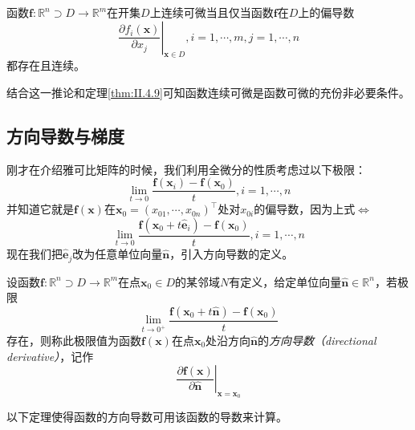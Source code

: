 \documentclass[main.tex]{subfiles}
\begin{document}
\begin{corollary}
    函数$\mathbf{f}:\mathbb{R}^n\supset D\rightarrow\mathbb{R}^m$在开集$D$上连续可微当且仅当函数$\mathbf{f}$在$D$上的偏导数
    \[
        \left.\frac{\partial f_i\left(\mathbf{x}\right)}{\partial x_j}\right|_{\mathbf{x}\in D},i=1,\cdots,m,j=1,\cdots,n
    \]
    都存在且连续。
\end{corollary}

结合这一推论和定理\ref{thm:II.4.9}可知函数连续可微是函数可微的充份非必要条件。

\subsection{方向导数与梯度}
刚才在介绍雅可比矩阵的时候，我们利用全微分的性质考虑过以下极限：
\[
    \lim_{t\to 0}\frac{\mathbf{f}\left(\mathbf{x}_i\right)-\mathbf{f}\left(\mathbf{x}_0\right)}{t},i=1,\cdots,n\]
并知道它就是$\mathbf{f}\left(\mathbf{x}\right)$在$\mathbf{x}_0=\left(x_{01},\cdots,x_{0n}\right)^\intercal$处对$x_{0i}$的偏导数，因为上式$\Leftrightarrow$
\[
    \lim_{t\rightarrow 0}\frac{\mathbf{f}\left(\mathbf{x}_0+t\mathbf{\hat{e}}_i\right)-\mathbf{f}\left(\mathbf{x}_0\right)}{t},i=1,\cdots,n
\]
现在我们把$\mathbf{\hat{e}}_j$改为任意单位向量$\mathbf{\hat{n}}$，引入方向导数的定义。

\begin{definition}[方向导数]\label{def:II.4.18}
    设函数$\mathbf{f}:\mathbb{R}^n\supset D\rightarrow\mathbb{R}^m$在点$\mathbf{x}_0\in D$的某邻域$N$有定义，给定单位向量$\mathbf{\hat{n}}\in\mathbb{R}^n$，若极限
    \[\lim_{t\to 0^+}\frac{\mathbf{f}\left(\mathbf{x}_0+t\mathbf{\hat{n}}\right)-\mathbf{f}\left(\mathbf{x}_0\right)}{t}\]
    存在，则称此极限值为函数$\mathbf{f}\left(\mathbf{x}\right)$在点$\mathbf{x}_0$处沿方向$\mathbf{\hat{n}}$的\emph{方向导数（directional derivative）}，记作
    \[\left.\frac{\partial\mathbf{f}\left(\mathbf{x}\right)}{\partial\mathbf{\hat{n}}}\right|_{\mathbf{x}=\mathbf{x}_0}\]
\end{definition}

以下定理使得函数的方向导数可用该函数的导数来计算。
\end{document}
